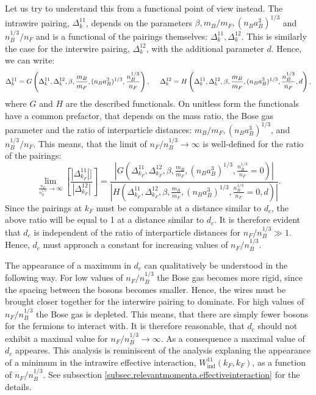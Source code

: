 Let us try to understand this from a functional point of view instead. The intrawire pairing, $\Delta^{11}_k$, depends on the parameters $\beta, m_B/m_F, (n_Ba_B^3)^{1/3}$ and $n_B^{1/3}/n_F$ and is a functional of the pairings themselves: $\Delta^{11}_k, \Delta^{12}_k$. This is similarly the case for the interwire pairing, $\Delta^{12}_k$, with the additional parameter $d$. Hence, we can write:
\begin{equation}
\Delta^{11}_k = G\left(\Delta^{11}_k, \Delta^{12}_k, \beta, \frac{m_B}{m_F}, (n_Ba_B^3)^{1/3}, \frac{n_B^{1/3}}{n_F} \right), \hspace{0.5cm} \Delta^{12}_k = H\left(\Delta^{11}_k, \Delta^{12}_k, \beta, \frac{m_B}{m_F}, (n_Ba_B^3)^{1/3}, \frac{n_B^{1/3}}{n_F}, d \right), \nonumber 
\end{equation}
where $G$ and $H$ are the described functionals. On unitless form the functionals have a common prefactor, that depends on the mass ratio, the Bose gas parameter and the ratio of interparticle distances: $m_B/m_F, (n_Ba_B^3)^{1/3}$, and $n_B^{1/3}/n_F$. This means, that the limit of $n_F/n_B^{1/3} \to \infty $ is well-defined for the ratio of the pairings:
\begin{equation}
\lim_{\frac{n_F}{n_B^{1/3}} \to \infty} \left[\frac{|\Delta^{11}_{k_F}|]}{|\Delta^{12}_{k_F}|}\right] = \frac{\left|G\left(\Delta^{11}_{k_F}, \Delta^{12}_{k_F}, \beta, \frac{m_B}{m_F}, (n_Ba_B^3)^{1/3}, \frac{n_B^{1/3}}{n_F} = 0 \right)\right|}{\left|H\left(\Delta^{11}_{k_F}, \Delta^{12}_{k_F}, \beta, \frac{m_B}{m_F}, (n_Ba_B^3)^{1/3}, \frac{n_B^{1/3}}{n_F} = 0, d \right)\right|}. \nonumber
\end{equation}
Since the pairings at $k_F$ must be comparable at a distance similar to $d_c$, the above ratio will be equal to 1 at a distance similar to $d_c$. It is therefore evident that $d_c$ is independent of the ratio of interparticle distances for $n_F/n_B^{1/3} \gg 1$. Hence, $d_c$ must approach a constant for increasing values of $n_F/n_B^{1/3}$. 

The appearance of a maximum in $d_c$ can qualitatively be understood in the following way. For low values of $n_F/n_B^{1/3}$ the Bose gas becomes more rigid, since the spacing between the bosons becomes smaller. Hence, the wires must be brought closer together for the interwire pairing to dominate. For high values of $n_F/n_B^{1/3}$ the Bose gas is depleted. This means, that there are simply fewer bosons for the fermions to interact with. It is therefore reasonable, that $d_c$ should not exhibit a maximal value for $n_F/n_B^{1/3} \to \infty$. As a consequence a maximal value of $d_c$ appeares. This analysis is reminiscent of the analysis explaning the appearance of a minimum in the intrawire effective interaction, $W_\text{ind}^{11}(k_F,k_F)$, as a function of $n_F/n_B^{1/3}$. See subsection \ref{subsec.relevantmomenta.effectiveinteraction} for the details.  